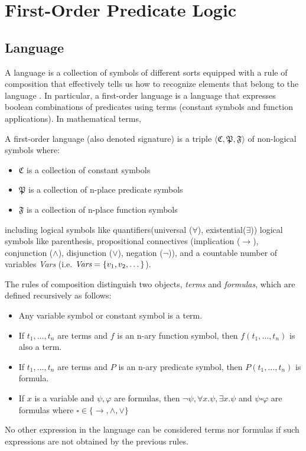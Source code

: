 \section{First-Order Predicate Logic}

\subsection{Language}
A language is a collection of symbols of different sorts equipped with a rule of composition that effectively tells us how to recognize elements that belong to the language \cite{DBLP:books/daglib/0080654}. In particular, a first-order language is a language that expresses boolean combinations of predicates using terms (constant symbols and function applications). In mathematical terms, 

\begin{definition}
 A first-order language (also denoted signature) is a triple $\langle \mathfrak{C}, \mathfrak{P}, \mathfrak{F} \rangle$ of non-logical symbols where:

\begin{itemize}
  \item $\mathfrak{C}$ is a collection of constant symbols
  \item $\mathfrak{P}$ is a collection of n-place predicate symbols
  \item $\mathfrak{F}$ is a collection of n-place function symbols
\end{itemize}

including logical symbols like quantifiers(universal ($\forall$), existential($\exists$)) logical symbols like parenthesis, propositional connectives (implication ($\rightarrow$), conjunction ($\land$), disjunction ($\lor$), negation ($\neg$)), and a countable number of variables \emph{Vars} (i.e. $\emph{Vars} = \{v_1, v_2, \dots\}$).

The rules of composition distinguish two objects, \emph{terms} and \emph{formulas}, which are defined recursively as follows:

\begin{itemize}
  \item Any variable symbol or constant symbol is a term.
  \item If $t_1, \dots, t_n$ are terms and $f$ is an n-ary function symbol, then $f(t_1, \dots, t_n)$ is also a term.
  \item If $t_1, \dots, t_n$ are terms and $P$ is an n-ary predicate symbol, then $P(t_1, \dots, t_n)$ is formula.
  \item If $x$ is a variable and $\psi, \varphi$ are formulas, then $\neg \psi, \forall x . \psi, \exists x . \psi$ and $\psi \square \varphi$ are formulas where $\square \in \{\rightarrow, \land, \lor\}$
\end{itemize}
No other expression in the language can be considered terms nor formulas if such expressions are not obtained by the previous rules.


\end{definition}
